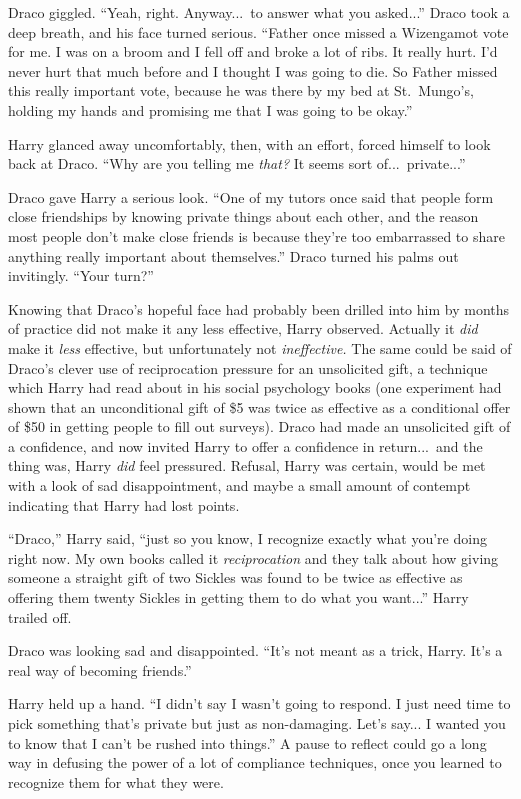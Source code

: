 Draco giggled. “Yeah, right. Anyway...\ to answer what you asked...” Draco took a deep breath, and his face turned serious. “Father once missed a Wizengamot vote for me. I was on a broom and I fell off and broke a lot of ribs. It really hurt. I’d never hurt that much before and I thought I was going to die. So Father missed this really important vote, because he was there by my bed at St.~Mungo’s, holding my hands and promising me that I was going to be okay.”

Harry glanced away uncomfortably, then, with an effort, forced himself to look back at Draco. “Why are you telling me \emph{that?} It seems sort of...\ private...”

Draco gave Harry a serious look. “One of my tutors once said that people form close friendships by knowing private things about each other, and the reason most people don’t make close friends is because they’re too embarrassed to share anything really important about themselves.” Draco turned his palms out invitingly. “Your turn?”

Knowing that Draco’s hopeful face had probably been drilled into him by months of practice did not make it any less effective, Harry observed. Actually it \emph{did} make it \emph{less} effective, but unfortunately not \emph{ineffective.} The same could be said of Draco’s clever use of reciprocation pressure for an unsolicited gift, a technique which Harry had read about in his social psychology books (one experiment had shown that an unconditional gift of \$5 was twice as effective as a conditional offer of \$50 in getting people to fill out surveys). Draco had made an unsolicited gift of a confidence, and now invited Harry to offer a confidence in return...\ and the thing was, Harry \emph{did} feel pressured. Refusal, Harry was certain, would be met with a look of sad disappointment, and maybe a small amount of contempt indicating that Harry had lost points.

“Draco,” Harry said, “just so you know, I recognize exactly what you’re doing right now. My own books called it \emph{reciprocation} and they talk about how giving someone a straight gift of two Sickles was found to be twice as effective as offering them twenty Sickles in getting them to do what you want...” Harry trailed off.

Draco was looking sad and disappointed. “It’s not meant as a trick, Harry. It’s a real way of becoming friends.”

Harry held up a hand. “I didn’t say I wasn’t going to respond. I just need time to pick something that’s private but just as non-damaging. Let’s say... I wanted you to know that I can’t be rushed into things.” A pause to reflect could go a long way in defusing the power of a lot of compliance techniques, once you learned to recognize them for what they were.

